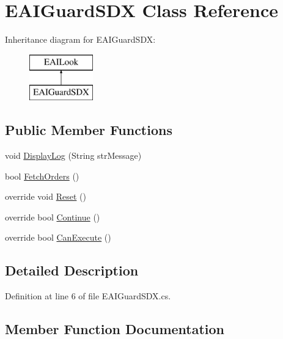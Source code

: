 \hypertarget{class_e_a_i_guard_s_d_x}{}\section{E\+A\+I\+Guard\+S\+DX Class Reference}
\label{class_e_a_i_guard_s_d_x}
Inheritance diagram for E\+A\+I\+Guard\+S\+DX\+:\begin{figure}[H]
\begin{center}
\leavevmode
\includegraphics[height=2.000000cm]{class_e_a_i_guard_s_d_x}
\end{center}
\end{figure}
\subsection*{Public Member Functions}
\begin{DoxyCompactItemize}
\item 
void \mbox{\hyperlink{class_e_a_i_guard_s_d_x_ac0341198cb9c52a5426046c398db7105}{Display\+Log}} (String str\+Message)
\item 
bool \mbox{\hyperlink{class_e_a_i_guard_s_d_x_af2404340be7f99173c0f5cdbb4ee2fcc}{Fetch\+Orders}} ()
\item 
override void \mbox{\hyperlink{class_e_a_i_guard_s_d_x_a2f74924f511b3891410c7faaec7b852b}{Reset}} ()
\item 
override bool \mbox{\hyperlink{class_e_a_i_guard_s_d_x_afd38634fac3d0e5904071101bd261b32}{Continue}} ()
\item 
override bool \mbox{\hyperlink{class_e_a_i_guard_s_d_x_a26047aaea537260cd1b3a671ceb8ba41}{Can\+Execute}} ()
\end{DoxyCompactItemize}


\subsection{Detailed Description}


Definition at line 6 of file E\+A\+I\+Guard\+S\+D\+X.\+cs.



\subsection{Member Function Documentation}
\mbox{\label{class_e_a_i_guard_s_d_x_a26047aaea537260cd1b3a671ceb8ba41}} 
